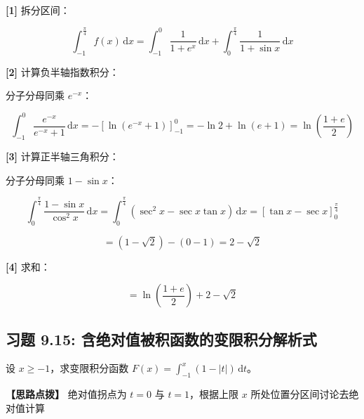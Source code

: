 \documentclass[11pt,a4paper,UTF8]{ctexart}
\begin{document}
\begin{solbox}[分步推导与答题规范]
\textbf{[1]} 拆分区间：


\begin{equation*}
\int_{-1}^{\frac{\pi}{4}} f(x)\,\mathrm{d}x = \int_{-1}^0 \frac{1}{1+e^x}\,\mathrm{d}x + \int_0^{\frac{\pi}{4}} \frac{1}{1+\sin x}\,\mathrm{d}x
\end{equation*}


\textbf{[2]} 计算负半轴指数积分：

分子分母同乘 $e^{-x}$：


\begin{equation*}
\int_{-1}^0 \frac{e^{-x}}{e^{-x}+1}\,\mathrm{d}x = -\left[ \ln(e^{-x}+1) \right]_{-1}^0 = -\ln 2 + \ln(e+1) = \ln\left(\frac{1+e}{2}\right)
\end{equation*}


\textbf{[3]} 计算正半轴三角积分：

分子分母同乘 $1-\sin x$：


\begin{equation*}
\int_0^{\frac{\pi}{4}} \frac{1-\sin x}{\cos^2 x}\,\mathrm{d}x = \int_0^{\frac{\pi}{4}} (\sec^2 x - \sec x\tan x)\,\mathrm{d}x = \left[ \tan x - \sec x \right]_0^{\frac{\pi}{4}}
\end{equation*}



\begin{equation*}
= (1 - \sqrt{2}) - (0 - 1) = 2 - \sqrt{2}
\end{equation*}


\textbf{[4]} 求和：


\begin{equation*}
= \ln\left(\frac{1+e}{2}\right) + 2 - \sqrt{2}
\end{equation*}

\end{solbox}


\subsection{习题 9.15: 含绝对值被积函数的变限积分解析式}

设 $x \geqslant -1$，求变限积分函数 $F(x) = \int_{-1}^x (1-|t|)\,\mathrm{d}t$。

\textbf{\color{DeepPurple}【思路点拨】} 绝对值拐点为 $t=0$ 与 $t=1$，根据上限 $x$ 所处位置分区间讨论去绝对值计算
\end{document}
